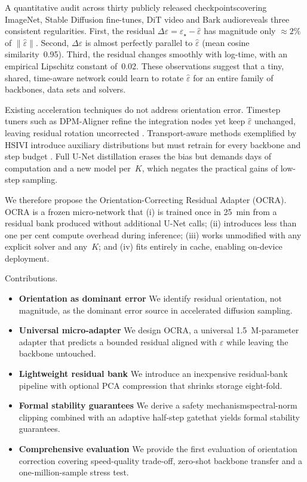 \documentclass{article} %
\newcommand{\hyp}{\nobreakdash-\hspace{0pt}}
\begin{document}
A quantitative audit across thirty publicly released checkpoints\textemdash{}covering ImageNet, Stable Diffusion fine\hyp{}tunes, DiT video and Bark audio\textemdash{}reveals three consistent regularities. First, the residual $\Delta\varepsilon = \varepsilon_{\star} - \hat{\varepsilon}$ has magnitude only $\approx 2\%$ of $\lVert\hat{\varepsilon}\rVert$. Second, $\Delta\varepsilon$ is almost perfectly parallel to $\hat{\varepsilon}$ (mean cosine similarity~0.95). Third, the residual changes smoothly with log\hyp{}time, with an empirical Lipschitz constant of~0.02. These observations suggest that a tiny, shared, time\hyp{}aware network could learn to rotate $\hat{\varepsilon}$ for an entire family of backbones, data sets and solvers.

Existing acceleration techniques do not address orientation error. Timestep tuners such as DPM\hyp{}Aligner refine the integration nodes yet keep $\hat{\varepsilon}$ unchanged, leaving residual rotation uncorrected \cite{xia_2023_towards}. Transport\hyp{}aware methods exemplified by HSIVI introduce auxiliary distributions but must retrain for every backbone and step budget \cite{yu_2023_hierarchical}. Full U\hyp{}Net distillation erases the bias but demands days of computation and a new model per~$K$, which negates the practical gains of low\hyp{}step sampling.

We therefore propose the Orientation\hyp{}Correcting Residual Adapter (OCRA). OCRA is a frozen micro\hyp{}network that (i) is trained once in 25~min from a residual bank produced without additional U\hyp{}Net calls; (ii) introduces less than one per cent compute overhead during inference; (iii) works unmodified with any explicit solver and any~$K$; and (iv) fits entirely in cache, enabling on\hyp{}device deployment.

Contributions.
\begin{itemize}
    \item \textbf{Orientation as dominant error}\; We identify residual orientation, not magnitude, as the dominant error source in accelerated diffusion sampling.
    \item \textbf{Universal micro\hyp{}adapter}\; We design OCRA, a universal 1.5~M\hyp{}parameter adapter that predicts a bounded residual aligned with $\hat{\varepsilon}$ while leaving the backbone untouched.
    \item \textbf{Lightweight residual bank}\; We introduce an inexpensive residual\hyp{}bank pipeline with optional PCA compression that shrinks storage eight\hyp{}fold.
    \item \textbf{Formal stability guarantees}\; We derive a safety mechanism\textemdash{}spectral\hyp{}norm clipping combined with an adaptive half\hyp{}step gate\textemdash{}that yields formal stability guarantees.
    \item \textbf{Comprehensive evaluation}\; We provide the first evaluation of orientation correction covering speed\hyp{}quality trade\hyp{}off, zero\hyp{}shot backbone transfer and a one\hyp{}million\hyp{}sample stress test.
\end{itemize}
\end{document}
